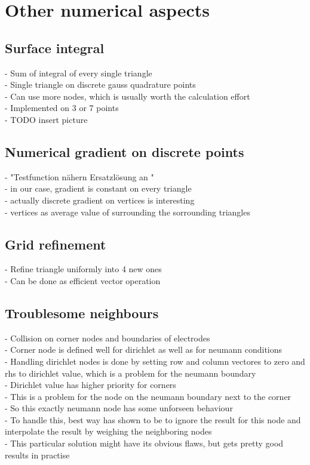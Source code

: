 \documentclass[parskip=half, titlepage=yes, 12pt, BCOR=12mm, DIV=calc]{scrartcl}
\begin{document}
\newpage


\section{Other numerical aspects }


\subsection{Surface integral}
- Sum of integral of every single triangle \\
- Single triangle on discrete gauss quadrature points \\
- Can use more nodes, which is usually worth the calculation effort \\
- Implemented on 3 or 7 points \\
- TODO insert picture \\

\subsection{Numerical gradient on discrete points}
- "Testfunction nähern Ersatzlösung an " \\
- in our case, gradient is constant on every triangle \\
- actually discrete gradient on vertices is interesting \\
- vertices as average value of surrounding the sorrounding triangles \\

\subsection{Grid refinement}
- Refine triangle uniformly into 4 new ones \\
- Can be done as efficient vector operation \\

\subsection{Troublesome neighbours}
- Collision on corner nodes and boundaries of electrodes \\
- Corner node is defined well for dirichlet as well as for neumann conditions \\
- Handling dirichlet nodes is done by setting row and column vectores to zero and rhs to dirichlet value, which is a problem for the neumann boundary  \\
- Dirichlet value has higher priority for corners \\
- This is a problem for the node on the neumann boundary next to the corner \\
- So this exactly neumann node has some unforseen behaviour \\
- To handle this, best way has shown to be to ignore the result for this node and interpolate the result by weighing the neighboring nodes \\  
- This particular solution might have its obvious flaws, but gets pretty good results in practise \\
\end{document}
